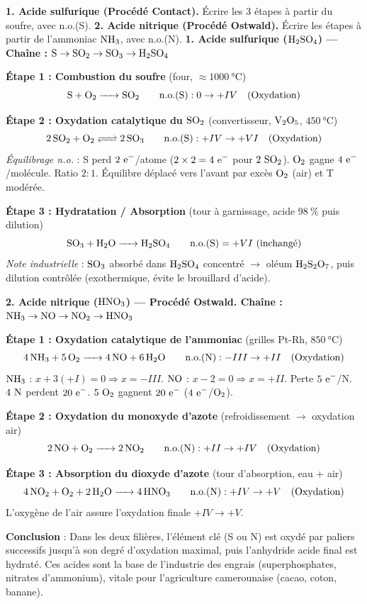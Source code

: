 \documentclass[11pt]{article}
\newcommand{\cle}[1]{{\popxbold\color{popdark}#1}}
\begin{document}
\begin{exoresolu}
\textbf{1. Acide sulfurique (Procédé Contact).} Écrire les 3 étapes à partir du soufre, avec n.o.(S).
\textbf{2. Acide nitrique (Procédé Ostwald).} Écrire les étapes à partir de l'ammoniac $\ce{NH3}$, avec n.o.(N).
\tcblower
\textbf{1. Acide sulfurique ($\ce{H2SO4}$) — Chaîne : $\ce{S} \to \ce{SO2} \to \ce{SO3} \to \ce{H2SO4}$}

\textbf{Étape 1 : Combustion du soufre} (four, $\approx \SI{1000}{\celsius}$)
\[ \ce{S + O2 -> SO2} \qquad \mathrm{n.o.}(\ce{S}) : 0 \to +IV \quad \text{(Oxydation)} \]

\textbf{Étape 2 : Oxydation catalytique du $\ce{SO2}$} (convertisseur, $\ce{V2O5}$, $\SI{450}{\celsius}$)
\[ \ce{2SO2 + O2 <=> 2SO3} \qquad \mathrm{n.o.}(\ce{S}) : +IV \to +VI \quad \text{(Oxydation)} \]
\textit{Équilibrage n.o.} : S perd $2\ \ce{e-}$/atome ($2 \times 2 = 4\ \ce{e-}$ pour $2\ \ce{SO2}$). $\ce{O2}$ gagne $4\ \ce{e-}$/molécule. Ratio $2:1$. Équilibre déplacé vers l'avant par excès $\ce{O2}$ (air) et T modérée.

\textbf{Étape 3 : Hydratation / Absorption} (tour à garnissage, acide $\SI{98}{\%}$ puis dilution)
\[ \ce{SO3 + H2O -> H2SO4} \qquad \mathrm{n.o.}(\ce{S}) = +VI \text{ (inchangé)} \]
\textit{Note industrielle} : $\ce{SO3}$ absorbé dans $\ce{H2SO4}$ concentré $\to$ oléum $\ce{H2S2O7}$, puis dilution contrôlée (exothermique, évite le brouillard d'acide).

\textbf{2. Acide nitrique ($\ce{HNO3}$) — Procédé Ostwald. Chaîne : $\ce{NH3} \to \ce{NO} \to \ce{NO2} \to \ce{HNO3}$}

\textbf{Étape 1 : Oxydation catalytique de l'ammoniac} (grilles Pt-Rh, $\SI{850}{\celsius}$)
\[ \ce{4NH3 + 5O2 -> 4NO + 6H2O} \qquad \mathrm{n.o.}(\ce{N}) : -III \to +II \quad \text{(Oxydation)} \]
$\ce{NH3}$ : $x + 3(+I) = 0 \Rightarrow x = -III$. $\ce{NO}$ : $x - 2 = 0 \Rightarrow x = +II$.
Perte $5\ \ce{e-}$/N. $4\ \ce{N}$ perdent $20\ \ce{e-}$. $5\ \ce{O2}$ gagnent $20\ \ce{e-}$ ($4\ \ce{e-}$/$\ce{O2}$).

\textbf{Étape 2 : Oxydation du monoxyde d'azote} (refroidissement $\to$ oxydation air)
\[ \ce{2NO + O2 -> 2NO2} \qquad \mathrm{n.o.}(\ce{N}) : +II \to +IV \quad \text{(Oxydation)} \]

\textbf{Étape 3 : Absorption du dioxyde d'azote} (tour d'absorption, eau + air)
\[ \ce{4NO2 + O2 + 2H2O -> 4HNO3} \qquad \mathrm{n.o.}(\ce{N}) : +IV \to +V \quad \text{(Oxydation)} \]
L'oxygène de l'air assure l'oxydation finale $+IV \to +V$.

\textbf{Conclusion} : Dans les deux filières, l'élément clé (S ou N) est \cle{oxydé par paliers successifs} jusqu'à son degré d'oxydation maximal, puis l'anhydride acide final est hydraté. Ces acides sont la base de l'industrie des engrais (superphosphates, nitrates d'ammonium), vitale pour l'agriculture camerounaise (cacao, coton, banane).
\end{exoresolu}
\end{document}
